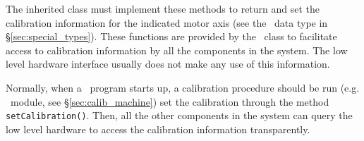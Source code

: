 The inherited class must implement these methods to return and set the
calibration information for the indicated motor axis (see the \hwcalib\ data
type in \S\ref{sec:special_types}). These functions are provided by the
\DCMotorHW\ class to facilitate access to calibration information by all the
components in the system. The low level hardware interface usually does not
make any use of this information.

Normally, when a \rhexlib\ program starts up, a calibration procedure should
be run (e.g. \CalibMachine\ module, see \S\ref{sec:calib_machine}) set the
calibration through the method {\tt setCalibration()}. Then, all the other
components in the system can query the low level hardware to access the
calibration information transparently.

